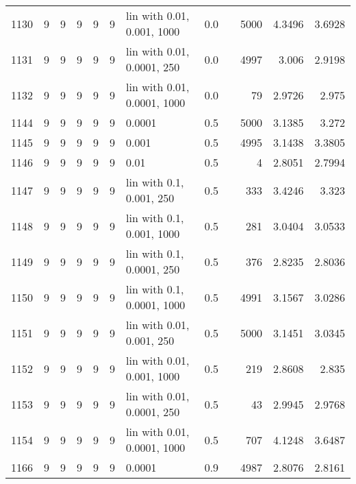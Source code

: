\begin{longtable}{lrrrrrlrrrrr}
 1130 &       9 & 9 & 9 & 9 & 9 &  lin with 0.01, 0.001, 1000 &      0.0 &        &    5000 &                 4.3496 &                 3.6928 \\
 1131 &       9 & 9 & 9 & 9 & 9 &  lin with 0.01, 0.0001, 250 &      0.0 &        &    4997 &                  3.006 &                 2.9198 \\
 1132 &       9 & 9 & 9 & 9 & 9 & lin with 0.01, 0.0001, 1000 &      0.0 &        &      79 &                 2.9726 &                  2.975 \\
 1144 &       9 & 9 & 9 & 9 & 9 &                      0.0001 &      0.5 &        &    5000 &                 3.1385 &                  3.272 \\
 1145 &       9 & 9 & 9 & 9 & 9 &                       0.001 &      0.5 &        &    4995 &                 3.1438 &                 3.3805 \\
 1146 &       9 & 9 & 9 & 9 & 9 &                        0.01 &      0.5 &        &       4 &                 2.8051 &                 2.7994 \\
 1147 &       9 & 9 & 9 & 9 & 9 &    lin with 0.1, 0.001, 250 &      0.5 &        &     333 &                 3.4246 &                  3.323 \\
 1148 &       9 & 9 & 9 & 9 & 9 &   lin with 0.1, 0.001, 1000 &      0.5 &        &     281 &                 3.0404 &                 3.0533 \\
 1149 &       9 & 9 & 9 & 9 & 9 &   lin with 0.1, 0.0001, 250 &      0.5 &        &     376 &                 2.8235 &                 2.8036 \\
 1150 &       9 & 9 & 9 & 9 & 9 &  lin with 0.1, 0.0001, 1000 &      0.5 &        &    4991 &                 3.1567 &                 3.0286 \\
 1151 &       9 & 9 & 9 & 9 & 9 &   lin with 0.01, 0.001, 250 &      0.5 &        &    5000 &                 3.1451 &                 3.0345 \\
 1152 &       9 & 9 & 9 & 9 & 9 &  lin with 0.01, 0.001, 1000 &      0.5 &        &     219 &                 2.8608 &                  2.835 \\
 1153 &       9 & 9 & 9 & 9 & 9 &  lin with 0.01, 0.0001, 250 &      0.5 &        &      43 &                 2.9945 &                 2.9768 \\
 1154 &       9 & 9 & 9 & 9 & 9 & lin with 0.01, 0.0001, 1000 &      0.5 &        &     707 &                 4.1248 &                 3.6487 \\
 1166 &       9 & 9 & 9 & 9 & 9 &                      0.0001 &      0.9 &        &    4987 &                 2.8076 &                 2.8161 \\

\end{longtable}
